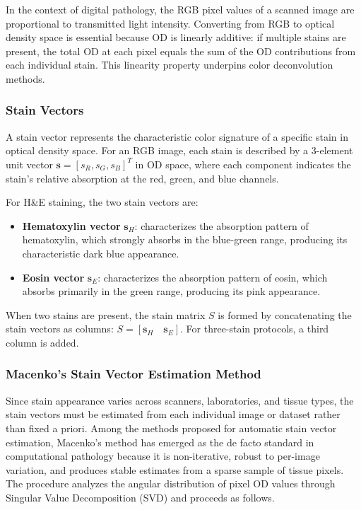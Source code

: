 In the context of digital pathology, the RGB pixel values of a scanned image are proportional to transmitted light intensity. Converting from RGB to optical density space is essential because OD is linearly additive: if multiple stains are present, the total OD at each pixel equals the sum of the OD contributions from each individual stain. This linearity property underpins color deconvolution methods.

\subsubsection{Stain Vectors}

A stain vector represents the characteristic color signature of a specific stain in optical density space. For an RGB image, each stain is described by a 3-element unit vector $\mathbf{s} = [s_R, s_G, s_B]^T$ in OD space, where each component indicates the stain's relative absorption at the red, green, and blue channels.

For H\&E staining, the two stain vectors are:
\begin{itemize}
	\item \textbf{Hematoxylin vector} $\mathbf{s}_H$: characterizes the absorption pattern of hematoxylin, which strongly absorbs in the blue-green range, producing its characteristic dark blue appearance.
	\item \textbf{Eosin vector} $\mathbf{s}_E$: characterizes the absorption pattern of eosin, which absorbs primarily in the green range, producing its pink appearance.
\end{itemize}

When two stains are present, the stain matrix $S$ is formed by concatenating the stain vectors as columns: $S = [\mathbf{s}_H \quad \mathbf{s}_E]$. For three-stain protocols, a third column is added.

\subsubsection{Macenko's Stain Vector Estimation Method}

Since stain appearance varies across scanners, laboratories, and tissue types, the stain vectors must be estimated from each individual image or dataset rather than fixed a priori. Among the methods proposed for automatic stain vector estimation, Macenko's method \cite{macenko2009} has emerged as the de facto standard in computational pathology because it is non-iterative, robust to per-image variation, and produces stable estimates from a sparse sample of tissue pixels. The procedure analyzes the angular distribution of pixel OD values through Singular Value Decomposition (SVD) and proceeds as follows.

